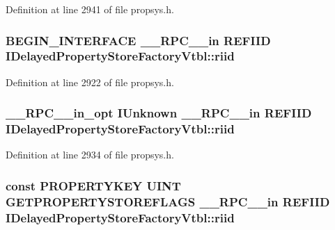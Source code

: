 Definition at line 2941 of file propsys.\+h.

\subsubsection[{\texorpdfstring{riid}{riid}}]{\setlength{\rightskip}{0pt plus 5cm}B\+E\+G\+I\+N\+\_\+\+I\+N\+T\+E\+R\+F\+A\+CE {\bf \+\_\+\+\_\+\+R\+P\+C\+\_\+\+\_\+in} {\bf R\+E\+F\+I\+ID} I\+Delayed\+Property\+Store\+Factory\+Vtbl\+::riid}\hypertarget{struct_i_delayed_property_store_factory_vtbl_a5671774445bdce04fb3ac0c9015d2ab2}{}\label{struct_i_delayed_property_store_factory_vtbl_a5671774445bdce04fb3ac0c9015d2ab2}


Definition at line 2922 of file propsys.\+h.

\subsubsection[{\texorpdfstring{riid}{riid}}]{ {\bf \+\_\+\+\_\+\+R\+P\+C\+\_\+\+\_\+in\+\_\+opt} I\+Unknown {\bf \+\_\+\+\_\+\+R\+P\+C\+\_\+\+\_\+in} {\bf R\+E\+F\+I\+ID} I\+Delayed\+Property\+Store\+Factory\+Vtbl\+::riid}\hypertarget{struct_i_delayed_property_store_factory_vtbl_a2a5a28cd4a2da2ce9d865b8b54bf0ebc}{}\label{struct_i_delayed_property_store_factory_vtbl_a2a5a28cd4a2da2ce9d865b8b54bf0ebc}


Definition at line 2934 of file propsys.\+h.

\subsubsection[{\texorpdfstring{riid}{riid}}]{ {\bf const} {\bf P\+R\+O\+P\+E\+R\+T\+Y\+K\+EY} {\bf U\+I\+NT} {\bf G\+E\+T\+P\+R\+O\+P\+E\+R\+T\+Y\+S\+T\+O\+R\+E\+F\+L\+A\+GS} {\bf \+\_\+\+\_\+\+R\+P\+C\+\_\+\+\_\+in} {\bf R\+E\+F\+I\+ID} I\+Delayed\+Property\+Store\+Factory\+Vtbl\+::riid}\hypertarget{struct_i_delayed_property_store_factory_vtbl_af35ce91c22eb9613e8d0a05b4b2d9009}{}\label{struct_i_delayed_property_store_factory_vtbl_af35ce91c22eb9613e8d0a05b4b2d9009}


